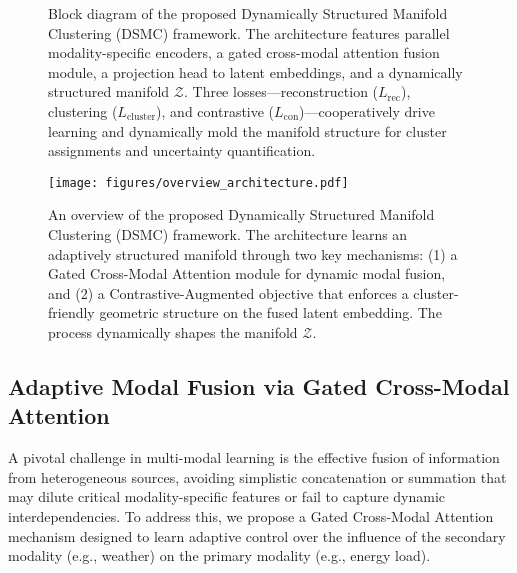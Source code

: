 \documentclass[journal]{IEEEtran}
\begin{document}
\begin{figure*}[ht]
{
}
\caption{Block diagram of the proposed Dynamically Structured Manifold Clustering (DSMC) framework. The architecture features parallel modality-specific encoders, a gated cross-modal attention fusion module, a projection head to latent embeddings, and a dynamically structured manifold $\mathcal{Z}$. Three losses—reconstruction ($L_\mathrm{rec}$), clustering ($L_\mathrm{cluster}$), and contrastive ($L_\mathrm{con}$)—cooperatively drive learning and dynamically mold the manifold structure for cluster assignments and uncertainty quantification.}
\end{figure*}

\begin{figure}[!t]
\centering
\texttt{[image: figures/overview\_architecture.pdf]} %
\caption{An overview of the proposed Dynamically Structured Manifold Clustering (DSMC) framework. The architecture learns an adaptively structured manifold through two key mechanisms: (1) a Gated Cross-Modal Attention module for dynamic modal fusion, and (2) a Contrastive-Augmented objective that enforces a cluster-friendly geometric structure on the fused latent embedding. The process dynamically shapes the manifold $\mathcal{Z}$.}
\label{fig:overview}
\end{figure}

\subsection{Adaptive Modal Fusion via Gated Cross-Modal Attention}
A pivotal challenge in multi-modal learning is the effective fusion of information from heterogeneous sources, avoiding simplistic concatenation or summation that may dilute critical modality-specific features or fail to capture dynamic interdependencies. To address this, we propose a Gated Cross-Modal Attention mechanism designed to learn adaptive control over the influence of the secondary modality (e.g., weather) on the primary modality (e.g., energy load).
\end{document}
